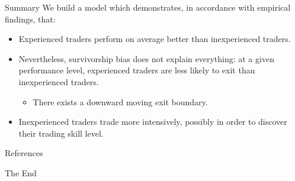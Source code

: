 \documentclass{beamer}
\begin{document}
\begin{frame}{Summary}
We build a model which demonstrates, in accordance with empirical findings, that:
\begin{itemize}
\item Experienced traders perform on average better than inexperienced traders.
\item Nevertheless, survivorship bias does not explain everything: at a given performance level, experienced traders are less likely to exit than inexperienced traders.
\begin{itemize}
	\item There exists a downward moving exit boundary.
\end{itemize}
\item Inexperienced traders trade more intensively, possibly in order to discover their trading skill level.
\end{itemize}
\end{frame}


\begin{frame}[allowframebreaks]{References}
	
	
\end{frame}


\begin{frame}
\Huge{\centerline{The End}}
\end{frame}
\end{document}
